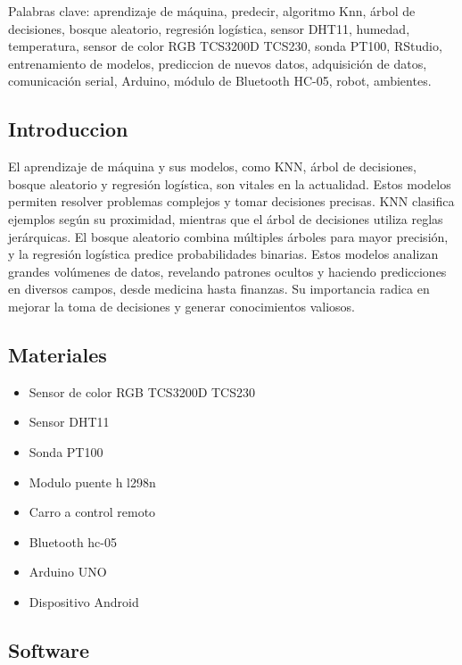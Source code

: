 \documentclass[
]{article}
\providecommand{\tightlist}{%
  \setlength{\itemsep}{0pt}\setlength{\parskip}{0pt}}
\begin{document}
Palabras clave: aprendizaje de máquina, predecir, algoritmo Knn, árbol
de decisiones, bosque aleatorio, regresión logística, sensor DHT11,
humedad, temperatura, sensor de color RGB TCS3200D TCS230, sonda PT100,
RStudio, entrenamiento de modelos, prediccion de nuevos datos,
adquisición de datos, comunicación serial, Arduino, módulo de Bluetooth
HC-05, robot, ambientes.

\hypertarget{introduccion}{%
\subsection{Introduccion}\label{introduccion}}

El aprendizaje de máquina y sus modelos, como KNN, árbol de decisiones,
bosque aleatorio y regresión logística, son vitales en la actualidad.
Estos modelos permiten resolver problemas complejos y tomar decisiones
precisas. KNN clasifica ejemplos según su proximidad, mientras que el
árbol de decisiones utiliza reglas jerárquicas. El bosque aleatorio
combina múltiples árboles para mayor precisión, y la regresión logística
predice probabilidades binarias. Estos modelos analizan grandes
volúmenes de datos, revelando patrones ocultos y haciendo predicciones
en diversos campos, desde medicina hasta finanzas. Su importancia radica
en mejorar la toma de decisiones y generar conocimientos valiosos.

\hypertarget{materiales}{%
\subsection{Materiales}\label{materiales}}

\begin{itemize}
\tightlist
\item
  Sensor de color RGB TCS3200D TCS230
\item
  Sensor DHT11
\item
  Sonda PT100
\item
  Modulo puente h l298n
\item
  Carro a control remoto
\item
  Bluetooth hc-05
\item
  Arduino UNO
\item
  Dispositivo Android
\end{itemize}

\hypertarget{software}{%
\subsection{Software}\label{software}}
\end{document}
